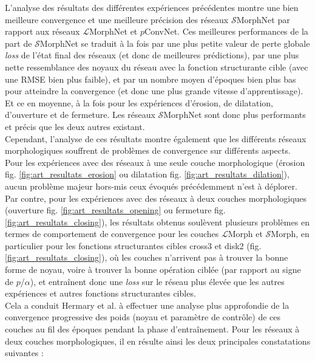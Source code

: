 L'analyse des résultats des différentes expériences précédentes montre une bien meilleure convergence et une meilleure précision des réseaux $\mathcal{S}$MorphNet par rapport aux réseaux $\mathcal{L}$MorphNet et $p$ConvNet. Ces meilleures performances de la part de $\mathcal{S}$MorphNet se traduit à la fois par une plus petite valeur de perte globale \textit{loss} de l'état final des réseaux (et donc de meilleures prédictions), par une plus nette ressemblance des noyaux du réseau avec la fonction structurante cible (avec une RMSE bien plus faible), et par un nombre moyen d'époques bien plus bas pour atteindre la convergence (et donc une plus grande vitesse d'apprentissage). Et ce en moyenne, à la fois pour les expériences d'érosion, de dilatation, d'ouverture et de fermeture. Les réseaux $\mathcal{S}$MorphNet sont donc plus performants et précis que les deux autres existant. \\

\vspace{-1.8mm}
Cependant, l'analyse de ces résultats montre également que les différents réseaux morphologiques souffrent de problèmes de convergence sur différents aspects. Pour les expériences avec des réseaux à une seule couche morphologique (érosion fig. \ref{fig:art_resultats_erosion} ou dilatation fig. \ref{fig:art_resultats_dilation}), aucun problème majeur hors-mis ceux évoqués précédemment n'est à déplorer. Par contre, pour les expériences avec des réseaux à deux couches morphologiques (ouverture fig. \ref{fig:art_resultats_opening} ou fermeture fig. \ref{fig:art_resultats_closing}), les résultats obtenus soulèvent plusieurs problèmes en termes de comportement de convergence pour les couches $\mathcal{L}$Morph et $\mathcal{S}$Morph, en particulier pour les fonctions structurantes cibles cross3 et disk2 (fig. \ref{fig:art_resultats_closing}), où les couches n'arrivent pas à trouver la bonne forme de noyau, voire à trouver la bonne opération ciblée (par rapport au signe de $p$/$\alpha$), et entraînent donc une \textit{loss} sur le réseau plus élevée que les autres expériences et autres fonctions structurantes cibles. \\

\vspace{-1.6mm}
Cela a conduit Hermary et al. \cite{Hermary_2022} à effectuer une analyse plus approfondie de la convergence progressive des poids (noyau et paramètre de contrôle) de ces couches au fil des époques pendant la phase d'entraînement. Pour les réseaux à deux couches morphologiques, il en résulte ainsi les deux principales constatations suivantes : \\

